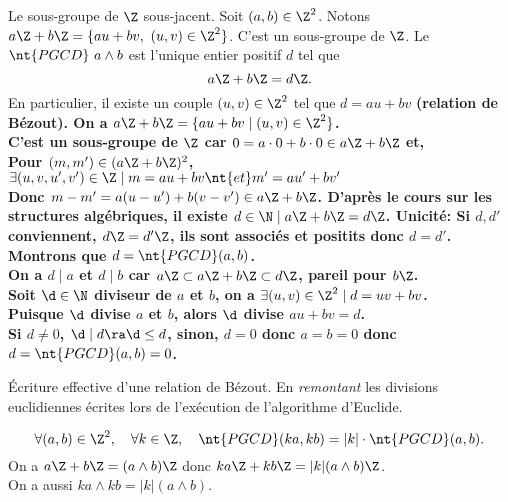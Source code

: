 \documentclass[11pt]{article}
\newcommand*{\PGCD}{\nt{PGCD}}
\begin{document}
\begin{prop}{Le sous-groupe de $\Z$ sous-jacent.}{}
    Soit $(a,b)\in\Z^2$. Notons $a\Z+b\Z=\{au+bv,~(u,v)\in\Z^2\}$. C'est un sous-groupe de $\Z$.\n
    Le $\PGCD~a\land b$ est l'unique entier positif $d$ tel que
    \begin{equation*}
        a\Z+b\Z=d\Z.
    \end{equation*}
    En particulier, il existe un couple $(u,v)\in\Z^2$ tel que $d=au+bv$ \bf{(relation de Bézout)}.
    \tcblower
    On a $a\Z+b\Z=\{au+bv\mid(u,v)\in\Z^2\}$.\\
    C'est un sous-groupe de $\Z$ car $0=a\cdot0+b\cdot0\in a\Z+b\Z$ et,\\Pour $(m,m')\in(a\Z+b\Z)^2$, $\exists(u,v,u',v')\in\Z\mid m=au+bv \nt{ et } m'=au'+bv'$\\
    Donc $m-m'=a(u-u')+b(v-v')\in a\Z+b\Z$.\n
    D'après le cours sur les structures algébriques, il existe $d\in\N\mid a\Z+b\Z=d\Z$.\n
    \bf{Unicité:} Si $d,d'$ conviennent, $d\Z=d'\Z$, ils sont associés et positits donc $d=d'$.\n
    Montrons que $d=\PGCD(a,b)$. \\
    On a $d\mid a$ et $d\mid b$ car $a\Z\subset a\Z+b\Z\subset d\Z$, pareil pour $b\Z$.\\
    Soit $\d\in\N$ diviseur de $a$ et $b$, on a $\exists (u,v)\in\Z^2\mid d=uv+bv$.\\
    Puisque $\d$ divise $a$ et $b$, alors $\d$ divise $au+bv=d$.\\
    Si $d\neq0$, $\d\mid d\ra \d\leq d$, sinon, $d=0$ donc $a=b=0$ donc $d=\PGCD(a,b)=0$.
\end{prop}

\begin{meth}{Écriture effective d'une relation de Bézout.}{}
    En \emph{remontant} les divisions euclidiennes écrites lors de l'exécution de l'algorithme d'Euclide.
\end{meth}

\begin{prop}{}{}
    \begin{equation*}
        \forall(a,b)\in\Z^2,\quad\forall k\in\Z,\quad\PGCD(ka,kb)=|k|\cdot\PGCD(a,b).
    \end{equation*}
    \tcblower
    On a $a\Z+b\Z=(a\land b)\Z$ donc $ka\Z+kb\Z=|k|(a\land b)\Z$.\\
    On a aussi $ka\land kb=|k|(a\land b)$.
\end{prop}
\end{document}
